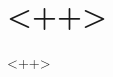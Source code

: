 \documentclass{article}%
\title{}
\author{Jace Babin}
\begin{document}
\maketitle

\section{<++>}

<++>
\end{document}
